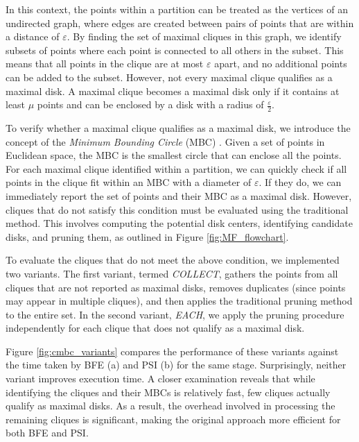 In this context, the points within a partition can be treated as the vertices of an undirected graph, where edges are created between pairs of points that are within a distance of $\varepsilon$. By finding the set of maximal cliques in this graph, we identify subsets of points where each point is connected to all others in the subset. This means that all points in the clique are at most $\varepsilon$ apart, and no additional points can be added to the subset.
However, not every maximal clique qualifies as a maximal disk. A maximal clique becomes a maximal disk only if it contains at least $\mu$ points and can be enclosed by a disk with a radius of $\frac{\varepsilon}{2}$.

To verify whether a maximal clique qualifies as a maximal disk, we introduce the concept of the \textit{Minimum Bounding Circle} (MBC) \cite{welzl_mbc_1991}. Given a set of points in Euclidean space, the MBC is the smallest circle that can enclose all the points. For each maximal clique identified within a partition, we can quickly check if all points in the clique fit within an MBC with a diameter of $\varepsilon$. If they do, we can immediately report the set of points and their MBC as a maximal disk.  However, cliques that do not satisfy this condition must be evaluated using the traditional method. This involves computing the potential disk centers, identifying candidate disks, and pruning them, as outlined in Figure \ref{fig:MF_flowchart}.

To evaluate the cliques that do not meet the above condition, we implemented two variants. The first variant, termed \textit{COLLECT}, gathers the points from all cliques that are not reported as maximal disks, removes duplicates (since points may appear in multiple cliques), and then applies the traditional pruning method to the entire set. In the second variant, \textit{EACH}, we apply the pruning procedure independently for each clique that does not qualify as a maximal disk.

Figure \ref{fig:cmbc_variants} compares the performance of these variants against the time taken by BFE (a) and PSI (b) for the same stage. Surprisingly, neither variant improves execution time. A closer examination reveals that while identifying the cliques and their MBCs is relatively fast, few cliques actually qualify as maximal disks. As a result, the overhead involved in processing the remaining cliques is significant, making the original approach more efficient for both BFE and PSI.

